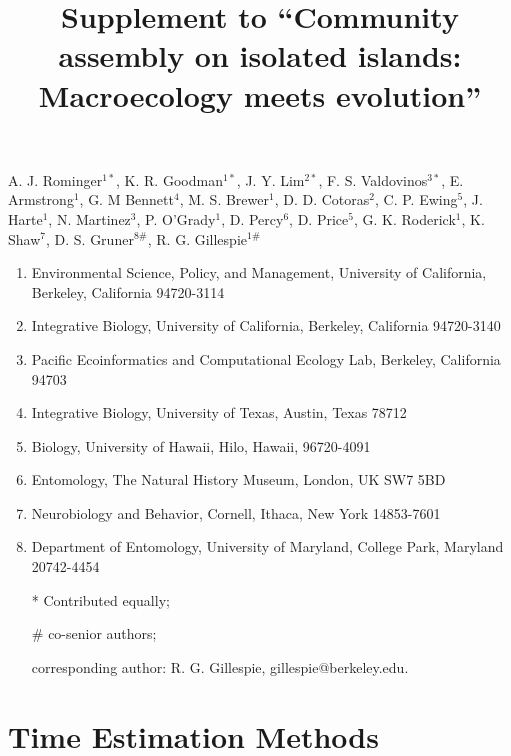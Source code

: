 \documentclass[12pt]{article}
\title{Supplement to ``Community assembly on isolated islands:
  Macroecology meets evolution''}
\author{}
\date{}
\begin{document}
\baselineskip24pt
\maketitle

A. J. Rominger$^{1*}$,
K. R. Goodman$^{1*}$, 
J. Y. Lim$^{2*}$, 
F. S. Valdovinos$^{3*}$, 
E. Armstrong$^1$,
G. M Bennett$^4$,
M. S. Brewer$^1$, 
D. D. Cotoras$^2$, 
C. P. Ewing$^5$, 
J. Harte$^1$,
N. Martinez$^3$,
P. O’Grady$^1$,
D. Percy$^6$,
D. Price$^5$,
G. K. Roderick$^1$,
K. Shaw$^7$,
D. S. Gruner$^{8\#}$,
R. G. Gillespie$^{1\#}$

\vspace{1em}

\begin{enumerate}
\item Environmental Science, Policy, and Management, University of
  California, Berkeley, California 94720-3114
\item Integrative Biology, University of California, Berkeley,
  California 94720-3140
\item Pacific Ecoinformatics and Computational Ecology Lab, Berkeley,
  California 94703
\item Integrative Biology, University of Texas, Austin, Texas 78712
\item Biology, University of Hawaii, Hilo, Hawaii, 96720-4091
\item Entomology, The Natural History Museum, London, UK SW7 5BD
\item Neurobiology and Behavior, Cornell, Ithaca, New York 14853-7601
\item Department of Entomology, University of Maryland, College Park,
  Maryland 20742-4454
\item[*] Contributed equally;
\item[\#] co-senior authors; 
\item[] corresponding author: R. G. Gillespie, gillespie@berkeley.edu.
\end{enumerate}

\clearpage

\section{Time Estimation Methods}
\end{document}
